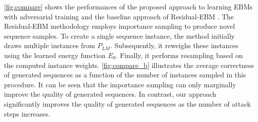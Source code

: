 \documentclass[11pt]{article}
\begin{document}
\cref{fig:compare} shows the performances of the proposed approach to learning EBMs with adversarial training and the baseline approach of Residual-EBM \citep{deng2019residual}. 
The Residual-EBM methodology employs importance sampling to produce novel sequence samples. To create a single sequence instance, the method initially draws multiple instances from \( P_{LM} \). Subsequently, it reweighs these instances using the learned energy function \( E_\theta \). Finally, it performs resampling based on the computed instance weights. \cref{fig:compare_b} illustrates the average correctness of generated sequences as a function of the number of instances sampled in this procedure. It can be seen that the importance sampling can only marginally improve the quality of generated sequences. In contrast, our approach significantly improves the quality of generated sequences as the number of attack steps increases.
\end{document}
